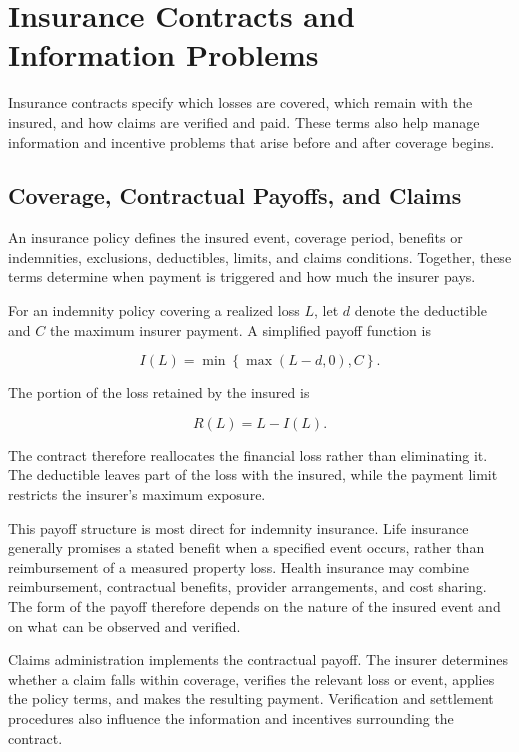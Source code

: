 \section{Insurance Contracts and Information Problems}

Insurance contracts specify which losses are covered, which remain with the insured, and how claims are verified and paid. These terms also help manage information and incentive problems that arise before and after coverage begins.


\subsection{Coverage, Contractual Payoffs, and Claims}

An insurance policy defines the insured event, coverage period, benefits or indemnities, exclusions, deductibles, limits, and claims conditions. Together, these terms determine when payment is triggered and how much the insurer pays.

For an indemnity policy covering a realized loss $L$, let $d$ denote the deductible and $C$ the maximum insurer payment. A simplified payoff function is

\begin{equation}
I(L)=\min\left\{\max(L-d,0), C\right\}.
\label{eq:ch15-insurance-payoff}
\end{equation}

The portion of the loss retained by the insured is

\begin{equation}
R(L)=L-I(L).
\label{eq:ch15-retained-loss}
\end{equation}

The contract therefore reallocates the financial loss rather than eliminating it. The deductible leaves part of the loss with the insured, while the payment limit restricts the insurer's maximum exposure.

This payoff structure is most direct for indemnity insurance. Life insurance generally promises a stated benefit when a specified event occurs, rather than reimbursement of a measured property loss. Health insurance may combine reimbursement, contractual benefits, provider arrangements, and cost sharing. The form of the payoff therefore depends on the nature of the insured event and on what can be observed and verified.

Claims administration implements the contractual payoff. The insurer determines whether a claim falls within coverage, verifies the relevant loss or event, applies the policy terms, and makes the resulting payment. Verification and settlement procedures also influence the information and incentives surrounding the contract.

